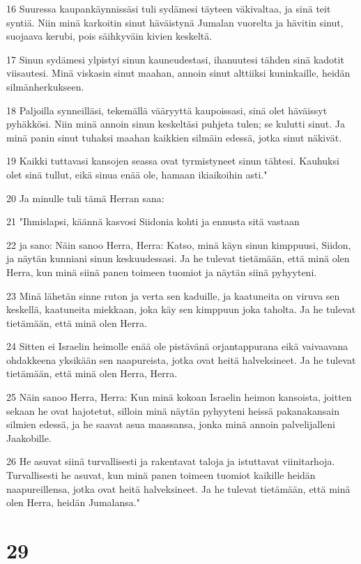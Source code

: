 \par 16 Suuressa kaupankäynnissäsi tuli sydämesi täyteen väkivaltaa, ja sinä teit syntiä. Niin minä karkoitin sinut häväistynä Jumalan vuorelta ja hävitin sinut, suojaava kerubi, pois säihkyväin kivien keskeltä.
\par 17 Sinun sydämesi ylpistyi sinun kauneudestasi, ihanuutesi tähden sinä kadotit viisautesi. Minä viskasin sinut maahan, annoin sinut alttiiksi kuninkaille, heidän silmänherkukseen.
\par 18 Paljoilla synneilläsi, tekemällä vääryyttä kaupoissasi, sinä olet häväissyt pyhäkkösi. Niin minä annoin sinun keskeltäsi puhjeta tulen; se kulutti sinut. Ja minä panin sinut tuhaksi maahan kaikkien silmäin edessä, jotka sinut näkivät.
\par 19 Kaikki tuttavasi kansojen seassa ovat tyrmistyneet sinun tähtesi. Kauhuksi olet sinä tullut, eikä sinua enää ole, hamaan ikiaikoihin asti."
\par 20 Ja minulle tuli tämä Herran sana:
\par 21 "Ihmislapsi, käännä kasvosi Siidonia kohti ja ennusta sitä vastaan
\par 22 ja sano: Näin sanoo Herra, Herra: Katso, minä käyn sinun kimppuusi, Siidon, ja näytän kunniani sinun keskuudessasi. Ja he tulevat tietämään, että minä olen Herra, kun minä siinä panen toimeen tuomiot ja näytän siinä pyhyyteni.
\par 23 Minä lähetän sinne ruton ja verta sen kaduille, ja kaatuneita on viruva sen keskellä, kaatuneita miekkaan, joka käy sen kimppuun joka taholta. Ja he tulevat tietämään, että minä olen Herra.
\par 24 Sitten ei Israelin heimolle enää ole pistävänä orjantappurana eikä vaivaavana ohdakkeena yksikään sen naapureista, jotka ovat heitä halveksineet. Ja he tulevat tietämään, että minä olen Herra, Herra.
\par 25 Näin sanoo Herra, Herra: Kun minä kokoan Israelin heimon kansoista, joitten sekaan he ovat hajotetut, silloin minä näytän pyhyyteni heissä pakanakansain silmien edessä, ja he saavat asua maassansa, jonka minä annoin palvelijalleni Jaakobille.
\par 26 He asuvat siinä turvallisesti ja rakentavat taloja ja istuttavat viinitarhoja. Turvallisesti he asuvat, kun minä panen toimeen tuomiot kaikille heidän naapureillensa, jotka ovat heitä halveksineet. Ja he tulevat tietämään, että minä olen Herra, heidän Jumalansa."

\chapter{29}

